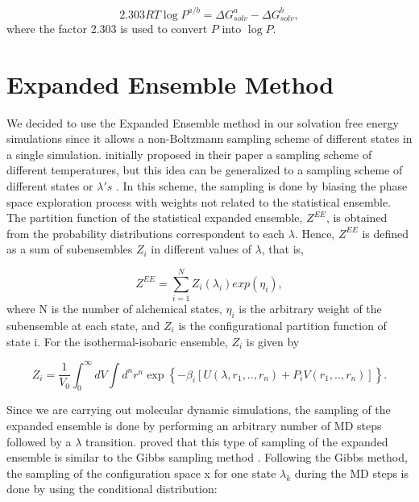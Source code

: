     \begin{equation}
    \label{eqn:partcoe}
    {2.303RT} \log{P}^{a/b} ={\Delta G_{solv}^{a} - \Delta G_{solv}^{b}},
    \end{equation}
    where the factor 2.303 is used to convert $P$ into $\log P$.

\section{Expanded Ensemble Method}\label{ee}
	
    We decided to use the Expanded Ensemble method \cite{lyubartsev} in our solvation free energy simulations since it allows a non-Boltzmann sampling scheme of different states in a single simulation.  initially proposed in their paper a sampling scheme of different temperatures, but this idea can be generalized to a sampling scheme of different states or $\lambda 's$ \cite{escobedo2007}. In this scheme, the sampling is done by biasing the phase space exploration process with weights not related to the statistical ensemble. The partition function of the statistical expanded ensemble, $Z^{EE}$, is obtained from the probability distributions correspondent to each $\lambda$. Hence, $Z^{EE}$ is defined as a sum of subensembles $Z_{i}$ in different values of $\lambda$, that is,
    
    \begin{equation}
    Z^{EE} = \sum_{i=1}^{N} Z_{i}(\lambda_{i}) exp(\eta_{i}),
    \label{eqn:ee}
    \end{equation}   
    where N is the number of alchemical states, $\eta_{i}$ is the arbitrary weight of the subensemble at each state, and $Z_{i}$ is the configurational partition function of state i. For the isothermal-isobaric ensemble, $Z_{i}$ is given by
    
    \begin{equation}
    Z_{i} = \frac{1}{V_{0}} {\int_{0}^{\infty} dV \int d^{n}r^{n} \exp \left \lbrace -\beta_{i} \left[ U(\lambda, r_{1},..,r_{n}) + P_{i}V(r_{1},..,r_{n}) \right] \right \rbrace}.
    \end{equation} 
    
     Since we are carrying out molecular dynamic simulations, the sampling of the expanded ensemble is done by performing an arbitrary number of MD  steps followed by a $\lambda$ transition.  proved that this type of sampling of the expanded ensemble is similar to the Gibbs sampling method \cite{geman1984,liu2002}. Following the Gibbs method, the sampling of the configuration space x for one state $\lambda_{k}$ during the MD steps is done by using the conditional distribution:
    
